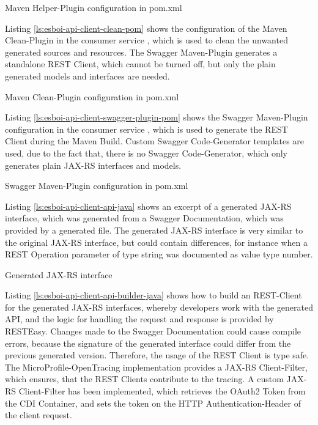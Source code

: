 \begin{listing}[h]
	\caption{Maven Helper-Plugin configuration in pom.xml}
	\label{ls:esboi-api-client-add-sources-pom}
\end{listing}

Listing \vref{ls:esboi-api-client-clean-pom} shows the configuration of the Maven Clean-Plugin in the consumer service , which is used to clean the unwanted generated sources and resources. The Swagger Maven-Plugin generates a standalone REST Client, which cannot be turned off, but only the plain generated models and interfaces are needed. 

\begin{listing}[h]
	\caption{Maven Clean-Plugin configuration in pom.xml}
	\label{ls:esboi-api-client-clean-pom}
\end{listing}

Listing \vref{ls:esboi-api-client-swagger-plugin-pom} shows the Swagger Maven-Plugin configuration in the consumer service , which is used to generate the REST Client during the Maven Build. Custom Swagger Code-Generator templates are used, due to the fact that, there is no Swagger Code-Generator, which only generates plain JAX-RS interfaces and models. 
\newpage

\begin{listing}[h]
	\caption{Swagger Maven-Plugin configuration in pom.xml}
	\label{ls:esboi-api-client-swagger-plugin-pom}
\end{listing}

Listing \vref{ls:esboi-api-client-api-java} shows an excerpt of a generated JAX-RS interface, which was generated from a Swagger Documentation, which was provided by a generated  file. The generated JAX-RS interface is very similar to the original JAX-RS interface, but could contain differences, for instance when a REST Operation parameter of type string was documented as value type number.

\begin{listing}[h]
	\caption{Generated JAX-RS interface}
	\label{ls:esboi-api-client-api-java}
\end{listing}

Listing \vref{ls:esboi-api-client-api-builder-java} shows how to build an REST-Client for the generated JAX-RS interfaces, whereby developers work with the generated API, and the logic for handling the request and response is provided by RESTEasy. Changes made to the Swagger Documentation could cause compile errors, because the signature of the generated interface could differ from the previous generated version. Therefore, the usage of the REST Client is type safe. The MicroProfile-OpenTracing implementation provides a JAX-RS Client-Filter, which ensures, that the REST Clients contribute to the tracing. A custom JAX-RS Client-Filter has been implemented, which retrieves the OAuth2 Token from the CDI Container, and sets the token on the HTTP Authentication-Header of the client request\cite{RESTEasy2018}.

